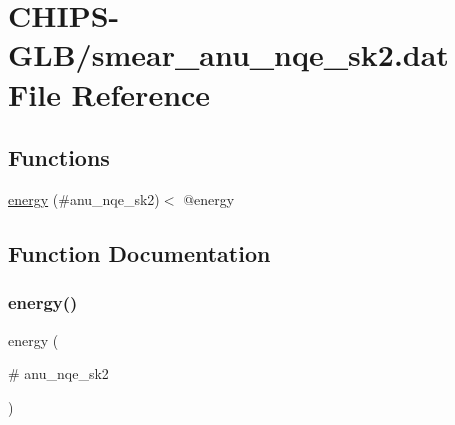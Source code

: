 \hypertarget{smear__anu__nqe__sk2_8dat}{}\section{C\+H\+I\+P\+S-\/\+G\+L\+B/smear\+\_\+anu\+\_\+nqe\+\_\+sk2.dat File Reference}
\label{smear__anu__nqe__sk2_8dat}
\subsection*{Functions}
\begin{DoxyCompactItemize}
\item 
\hyperlink{smear__anu__nqe__sk2_8dat_a1425fbad50c910366f944b9bf64e9c9c}{energy} (\#anu\+\_\+nqe\+\_\+sk2)$<$ @energy
\end{DoxyCompactItemize}


\subsection{Function Documentation}
\mbox{\label{smear__anu__nqe__sk2_8dat_a1425fbad50c910366f944b9bf64e9c9c}} 
\subsubsection{\texorpdfstring{energy()}{energy()}}
{\footnotesize\ttfamily energy (\begin{DoxyParamCaption}\item[{\#}]{anu\+\_\+nqe\+\_\+sk2 }\end{DoxyParamCaption})}

